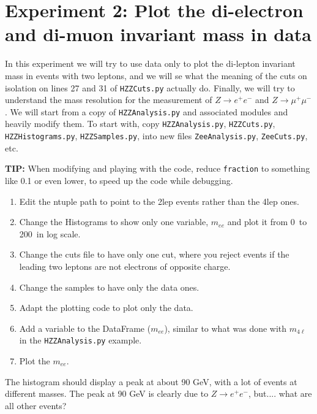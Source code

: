 \section{Experiment 2: Plot the di-electron and di-muon invariant mass in data}

In this experiment we will try to use data only to plot the di-lepton invariant mass in events with two leptons, and we will se what the meaning of the cuts on isolation on lines 27 and 31 of \verb|HZZCuts.py| actually do. Finally, we will try to understand the mass resolution for the measurement of $Z\rightarrow e^+e^-$ and $Z\rightarrow \mu^+\mu^-$. We will start from a copy of \verb|HZZAnalysis.py| and associated modules and heavily modify them. To start with, copy \verb|HZZAnalysis.py|, \verb|HZZCuts.py|, \verb|HZZHistograms.py|, \verb|HZZSamples.py|, into new files \verb|ZeeAnalysis.py|, \verb|ZeeCuts.py|, etc. 

\begin{remark}
\textbf{TIP:} When modifying and playing with the code, reduce \verb|fraction| to something like 0.1 or even lower, to speed up the code while debugging.
\end{remark}


\begin{enumerate} 
\item Edit the ntuple path to point to the 2lep events rather than the 4lep ones. 
\item Change the Histograms to show only one variable, $m_{ee}$ and plot it from 0\ \GeV to 200\ \GeV in log scale. 
\item Change the cuts file to have only one cut, where you reject events if the leading two leptons are not electrons of opposite charge. 
\item Change the samples to have only the data ones. 
\item Adapt the plotting code to plot only the data. 
\item Add a variable to the DataFrame ($m_{ee}$), similar to what was done with $m_{4\ell}$ in the \verb|HZZAnalysis.py| example.
\item Plot the $m_{ee}$. 
\end{enumerate}

\begin{remark}
The histogram should display a peak at about 90 GeV, with a lot of events at different masses. The peak at 90 GeV is clearly due to $Z\rightarrow e^+ e^-$, but.... what are all other events?
\end{remark}

